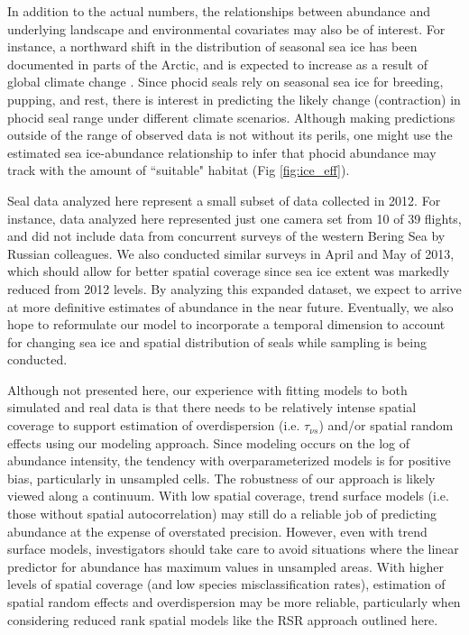 \documentclass[12pt,fleqn]{article}
\begin{document}
\begin{flushleft}
\hspace{.5in}In addition to the actual numbers, the relationships between abundance and underlying landscape and environmental covariates may also be of interest.  For instance, a northward shift in the distribution of seasonal sea ice has been documented in parts of the Arctic, and is expected to increase as a result of global climate change \citep{WangOverland2009}.  Since phocid seals rely on seasonal sea ice for breeding, pupping, and rest, there is interest in predicting the likely change (contraction) in phocid seal range under different climate scenarios.  Although making predictions outside of the range of observed data is not without its perils, one might use the estimated sea ice-abundance relationship to infer that phocid abundance may track with the amount of ``suitable" habitat (Fig \ref{fig:ice_eff}).

\hspace{.5in}Seal data analyzed here represent a small subset of data collected in 2012.  For instance, data analyzed here represented just one camera set from 10 of 39 flights, and did not include data from concurrent surveys of the western Bering Sea by Russian colleagues. We also conducted similar surveys in April and May of 2013, which should allow for better spatial coverage since sea ice extent was markedly reduced from 2012 levels. By analyzing this expanded dataset, we expect to arrive at more definitive estimates of abundance in the near future.  Eventually, we also hope to reformulate our model to incorporate a temporal dimension to account for changing sea ice and spatial distribution of seals while sampling is being conducted.

\hspace{.5in}Although not presented here, our experience with fitting models to both simulated and real data is that there needs to be relatively intense spatial coverage to support estimation of overdispersion (i.e. $\tau_{\nu s}$) and/or spatial random effects using our modeling approach.  Since modeling occurs on the log of abundance intensity, the tendency with overparameterized models is for positive bias, particularly in unsampled cells.  The robustness of our approach is likely viewed along a continuum.  With low spatial coverage, trend surface models (i.e. those without spatial autocorrelation) may still do a reliable job of predicting abundance at the expense of overstated precision.  However, even with trend surface models, investigators should take care to avoid situations where the linear predictor for abundance has maximum values in unsampled areas.  With higher levels of spatial coverage (and low species misclassification rates), estimation of spatial random effects and overdispersion may be more reliable, particularly when considering reduced rank spatial models like the RSR approach outlined here.


\end{flushleft}
\end{document}
